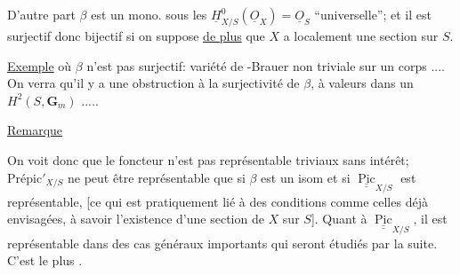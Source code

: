 D'autre part $\beta$ est un mono. sous les  $\underline H^0_{X/S}(\underline O_X)=\underline O_S$ ``universelle''; et il est surjectif donc bijectif si on suppose \uline{de plus} que  $X$ a localement une section sur $S$.

\uline{Exemple} où $\beta$ n'est pas surjectif: variété de -Brauer non triviale sur un corps .... On verra qu'il y a une obstruction à la surjectivité de $\beta$, à valeurs dans un $H^2(S,\mathbf G_m)$ .....

\uline{Remarque}

On voit donc que le foncteur  n'est pas représentable    triviaux sans intérêt; $\mathrm{Prépic}'_{X/S}$ ne peut être représentable que si $\beta$ est un isom et si $\underline{\underline{\operatorname{Pic}}}_{X/S}$ est représentable,  [ce qui est pratiquement lié à des conditions comme celles déjà envisagées, à savoir l'existence d'une section de $X$ sur $S$]. Quant à $\underline{\underline{\operatorname{Pic}}}_{X/S}$, il est représentable dans des cas généraux importants qui seront étudiés par la suite. C'est  le plus .
